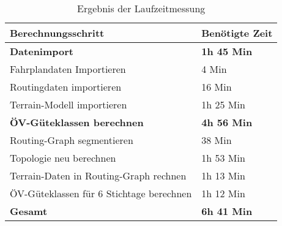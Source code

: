 \begin{table}[H]
    \centering
    \begin{tabular}[H]{l l}
        \toprule
        \textbf{Berechnungsschritt}
                                & \textbf{Benötigte Zeit}\\
        \midrule
        \textbf{Datenimport}
                                & \textbf{1h 45 Min} \\
        \hspace{3mm} Fahrplandaten Importieren
                                & \hspace{3mm} 4 Min \\
        \hspace{3mm} Routingdaten importieren
                                & \hspace{3mm} 16 Min \\
        \hspace{3mm} Terrain-Modell importieren
                                & \hspace{3mm} 1h 25 Min \\
        \midrule
        \textbf{\acs{ÖV}-Güteklassen berechnen}
                                & \textbf{4h 56 Min} \\
        \hspace{3mm} Routing-Graph segmentieren
                                & \hspace{3mm} 38 Min \\
        \hspace{3mm} Topologie neu berechnen
                                & \hspace{3mm} 1h 53 Min \\
        \hspace{3mm} Terrain-Daten in Routing-Graph rechnen
                                & \hspace{3mm} 1h 13 Min \\
        \hspace{3mm} \acs{ÖV}-Güteklassen für 6 Stichtage berechnen
                                & \hspace{3mm} 1h 12 Min \\
        \midrule
        \textbf{Gesamt}
                                & \textbf{6h 41 Min} \\
        \bottomrule
    \end{tabular}
    \caption{Ergebnis der Laufzeitmessung}
    \label{table:Ergebnis_Laufzeitmessung}
\end{table}


